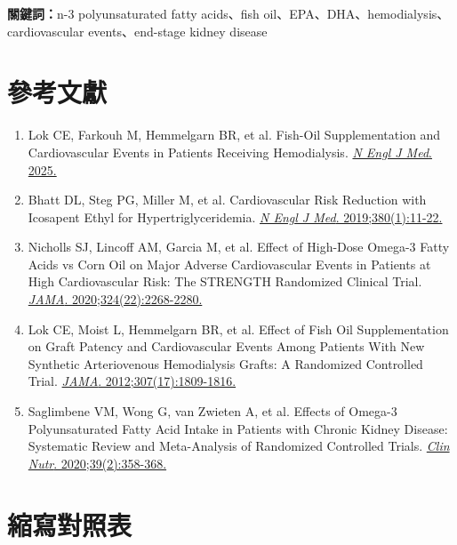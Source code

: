 \documentclass[12pt,a4paper]{article}
\begin{document}
\vspace{1cm}
\textbf{關鍵詞：}n-3 polyunsaturated fatty acids、fish oil、EPA、DHA、hemodialysis、cardiovascular events、end-stage kidney disease

\section{參考文獻}

\begin{enumerate}
    \item Lok CE, Farkouh M, Hemmelgarn BR, et al. Fish-Oil Supplementation and Cardiovascular Events in Patients Receiving Hemodialysis. \href{https://doi.org/10.1056/NEJMoa2513032}{\textit{N Engl J Med}. 2025.}

    \item Bhatt DL, Steg PG, Miller M, et al. Cardiovascular Risk Reduction with Icosapent Ethyl for Hypertriglyceridemia. \href{https://doi.org/10.1056/NEJMoa1812792}{\textit{N Engl J Med}. 2019;380(1):11-22.}

    \item Nicholls SJ, Lincoff AM, Garcia M, et al. Effect of High-Dose Omega-3 Fatty Acids vs Corn Oil on Major Adverse Cardiovascular Events in Patients at High Cardiovascular Risk: The STRENGTH Randomized Clinical Trial. \href{https://doi.org/10.1001/jama.2020.22258}{\textit{JAMA}. 2020;324(22):2268-2280.}

    \item Lok CE, Moist L, Hemmelgarn BR, et al. Effect of Fish Oil Supplementation on Graft Patency and Cardiovascular Events Among Patients With New Synthetic Arteriovenous Hemodialysis Grafts: A Randomized Controlled Trial. \href{https://doi.org/10.1001/jama.2012.3059}{\textit{JAMA}. 2012;307(17):1809-1816.}

    \item Saglimbene VM, Wong G, van Zwieten A, et al. Effects of Omega-3 Polyunsaturated Fatty Acid Intake in Patients with Chronic Kidney Disease: Systematic Review and Meta-Analysis of Randomized Controlled Trials. \href{https://doi.org/10.1016/j.clnu.2019.02.041}{\textit{Clin Nutr}. 2020;39(2):358-368.}
\end{enumerate}

\section{縮寫對照表}
\end{document}
